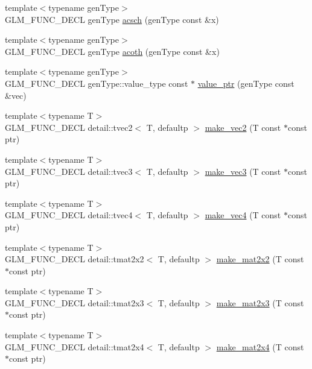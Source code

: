 \begin{CompactItemize}
\item 
{\footnotesize template$<$typename genType$>$ }\\GLM\_\-FUNC\_\-DECL genType \hyperlink{group__gtc__reciprocal_gb24c5c23d9d3d10517ad80f5af515b0e}{acsch} (genType const \&x)
\item 
{\footnotesize template$<$typename genType$>$ }\\GLM\_\-FUNC\_\-DECL genType \hyperlink{group__gtc__reciprocal_g651e435e3e8f63b1ea1da0e5e7581864}{acoth} (genType const \&x)
\item 
{\footnotesize template$<$typename genType$>$ }\\GLM\_\-FUNC\_\-DECL genType::value\_\-type const $\ast$ \hyperlink{group__gtc__type__ptr_g87d5cb613f75f83973609ccb8922200b}{value\_\-ptr} (genType const \&vec)
\item 
{\footnotesize template$<$typename T$>$ }\\GLM\_\-FUNC\_\-DECL detail::tvec2$<$ T, defaultp $>$ \hyperlink{group__gtc__type__ptr_g7009d8090f046d1ce98e59df584fff46}{make\_\-vec2} (T const $\ast$const ptr)
\item 
{\footnotesize template$<$typename T$>$ }\\GLM\_\-FUNC\_\-DECL detail::tvec3$<$ T, defaultp $>$ \hyperlink{group__gtc__type__ptr_g0b727d0acba617ec7b9af9f06892336a}{make\_\-vec3} (T const $\ast$const ptr)
\item 
{\footnotesize template$<$typename T$>$ }\\GLM\_\-FUNC\_\-DECL detail::tvec4$<$ T, defaultp $>$ \hyperlink{group__gtc__type__ptr_gf44d3c8aa09a7a8021ae5312e2f1f091}{make\_\-vec4} (T const $\ast$const ptr)
\item 
{\footnotesize template$<$typename T$>$ }\\GLM\_\-FUNC\_\-DECL detail::tmat2x2$<$ T, defaultp $>$ \hyperlink{group__gtc__type__ptr_g49c18920c113e1e72caea1c3978c8e7f}{make\_\-mat2x2} (T const $\ast$const ptr)
\item 
{\footnotesize template$<$typename T$>$ }\\GLM\_\-FUNC\_\-DECL detail::tmat2x3$<$ T, defaultp $>$ \hyperlink{group__gtc__type__ptr_g86620b90c993ff8e31f0dff1611bd2da}{make\_\-mat2x3} (T const $\ast$const ptr)
\item 
{\footnotesize template$<$typename T$>$ }\\GLM\_\-FUNC\_\-DECL detail::tmat2x4$<$ T, defaultp $>$ \hyperlink{group__gtc__type__ptr_g50245f47c0e6f5a2ab5ce157dc3e97ac}{make\_\-mat2x4} (T const $\ast$const ptr)
\item 

\end{CompactItemize}
